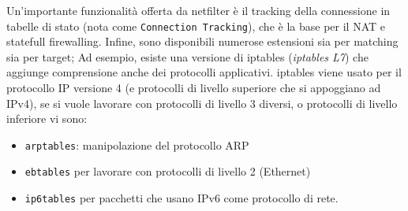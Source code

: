 Un'importante funzionalità offerta da netfilter è il tracking della connessione
in tabelle di stato (nota come \texttt{Connection Tracking}), che è la base
per il NAT e statefull firewalling.
Infine, sono disponibili numerose estensioni sia per matching sia per target;
Ad esempio, esiste una versione di iptables
(\textit{iptables L7}) che aggiunge comprensione anche dei protocolli applicativi.
iptables viene usato per il protocollo IP versione 4 (e protocolli di livello
superiore che si appoggiano ad IPv4), se si vuole lavorare con protocolli
di livello 3 diversi, o protocolli di livello inferiore vi sono:
\begin{itemize}
  \item \texttt{arptables}: manipolazione del protocollo ARP
  \item \texttt{ebtables} per lavorare con protocolli di livello 2 (Ethernet)
  \item \texttt{ip6tables} per pacchetti che usano IPv6 come protocollo di rete.
\end{itemize}
